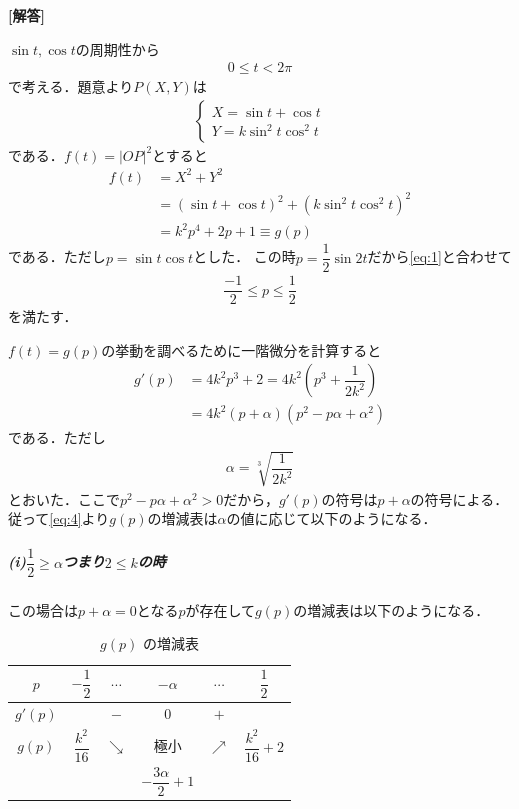 \documentclass[../../main.tex]{subfiles}
\begin{document}
\begin{oframed}
  
\end{oframed}

{\bf [解答]}

$\sin t, \cos t$の周期性から
\begin{align}
  0\le t<2\pi \label{eq:1}
\end{align}
で考える．題意より$P(X,Y)$は
\begin{align}
  \begin{cases}
    X = \sin t + \cos t \\
    Y = k\sin^2t\cos^2t
  \end{cases} \label{eq:2}
\end{align}
である．$f(t)=|OP|^2$とすると
\begin{align}
  f(t)
  &=X^2+Y^2 \\
  &=(\sin t+\cos t)^2+(k\sin^2t \cos^2t)^2 \\
  &=k^2p^4+2p+1\equiv g(p) \label{eq:3}
\end{align}
である．ただし$p=\sin t\cos t$とした．
この時$p=\dfrac{1}{2}\sin 2t$だから\cref{eq:1}と合わせて
\begin{align}
  \dfrac{-1}{2}\le p\le\dfrac{1}{2} \label{eq:4}
\end{align}
を満たす．

$f(t)=g(p)$の挙動を調べるために一階微分を計算すると
\begin{align}
  g'(p)
  &=4k^2p^3+2 = 4k^2\left(p^3+\dfrac{1}{2k^2}\right) \\
  &=4k^2\left(p+\alpha\right)\left(p^2-p\alpha+\alpha^2\right) \label{eq:5}
\end{align}
である．ただし
\begin{align}
  \alpha=\sqrt[3]{\dfrac{1}{2k^2}} \label{eq:6}
\end{align}
とおいた．ここで$p^2-p\alpha+\alpha^2>0$だから，$g'(p)$の符号は$p+\alpha$の符号による．
従って\cref{eq:4}より$g(p)$の増減表は$\alpha$の値に応じて以下のようになる．

\subparagraph{(i)$\dfrac{1}{2}\ge \alpha$つまり$2\le k$の時}

この場合は$p+\alpha=0$となる$p$が存在して$g(p)$の増減表は以下のようになる．

\begin{table}[htb]
  \centering
  \caption{$g(p)$ の増減表}
  \label{tab:g_increase_decrease}
  \renewcommand{\arraystretch}{1.4}
  \begin{tabular}{c|ccccc}
    $p$ & $-\dfrac{1}{2}$ & $\cdots$ & $-\alpha$ & $\cdots$ & $\dfrac{1}{2}$ \\
    \hline
    $g'(p)$ & & $-$ & $0$ & $+$ & \\
    \hline
    $g(p)$ & $\dfrac{k^2}{16}$ & $\searrow$ & 極小 & $\nearrow$ & $\dfrac{k^2}{16} + 2$ \\
    &                   &           & $-\dfrac{3\alpha}{2} + 1$ & &
  \end{tabular}
\end{table}
\end{document}
